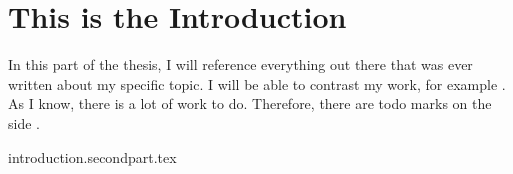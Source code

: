 \chapter{This is the Introduction}\label{ch:introduction}

In this part of the thesis, I will reference everything out there that
was ever written about my specific topic. I will be able to contrast my
work, for example \cite{Hartley2000}. As I know, there is a lot of work
to do. Therefore, there are todo marks on the side .


{introduction.secondpart.tex}
